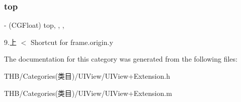 \subsubsection{\texorpdfstring{top}{top}}
{\footnotesize\ttfamily -\/ (C\+G\+Float) top\hspace{0.3cm}{\ttfamily [read]}, {\ttfamily [write]}, {\ttfamily [nonatomic]}, {\ttfamily [assign]}}

9.上 $<$ Shortcut for frame.\+origin.\+y 

The documentation for this category was generated from the following files\+:\begin{DoxyCompactItemize}
\item 
T\+H\+B/\+Categories(类目)/\+U\+I\+View/U\+I\+View+\+Extension.\+h\item 
T\+H\+B/\+Categories(类目)/\+U\+I\+View/U\+I\+View+\+Extension.\+m\end{DoxyCompactItemize}
